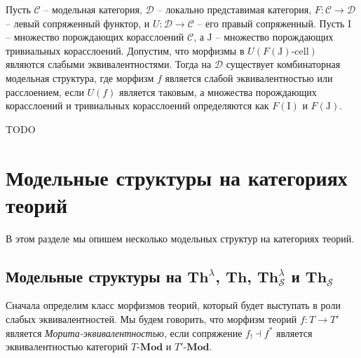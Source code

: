 \documentclass[reqno]{amsart}
\theoremstyle{definition}
\theoremstyle{remark}
\newcommand{\bcat}[1]{\mathbf{#1}}
\newcommand{\cat}[1]{\mathcal{#1}}
\renewcommand{\C}{\cat{C}}
\newcommand{\D}{\cat{D}}
\newcommand{\Mod}[1]{#1\text{-}\bcat{Mod}}
\newcommand{\Th}{\bcat{Th}}
\newcommand{\I}{\mathrm{I}}
\newcommand{\J}{\mathrm{J}}
\newcommand{\class}[2]{#1\text{-}\mathrm{#2}}
\newcommand{\Icell}[1][\I]{\class{#1}{cell}}
\begin{document}
\begin{prop}[transferred]
Пусть $\C$ -- модельная категория, $\D$ -- локально представимая категория, $F : \C \to \D$ -- левый сопряженный функтор, и $U : \D \to \C$ -- его правый сопряженный.
Пусть $\I$ -- множество порождающих корасслоений $\C$, а $\J$ -- множество порождающих тривиальных корасслоений.
Допустим, что морфизмы в $U(\Icell[F(\J)])$ являются слабыми эквивалентностями.
Тогда на $\D$ существует комбинаторная модельная структура, где морфизм $f$ является слабой эквивалентностью или расслоением, если $U(f)$ является таковым,
а множества порождающих корасслоений и тривиальных корасслоений определяются как $F(\I)$ и $F(\J)$.
\end{prop} 

TODO

\section{Модельные структуры на категориях теорий}

В этом разделе мы опишем несколько модельных структур на категориях теорий.

\subsection{Модельные структуры на $\Th^\lambda$, $\Th$, $\Th^\lambda_\mathcal{S}$ и $\Th_\mathcal{S}$}

Сначала определим класс морфизмов теорий, который будет выступать в роли слабых эквивалентностей.
Мы будем говорить, что морфизм теорий $f : T \to T'$ является \emph{Морита-эквивалентностью}, если сопряжение $f_! \dashv f^*$ является эквивалентностью категорий $\Mod{T}$ и $\Mod{T'}$.
\end{document}
